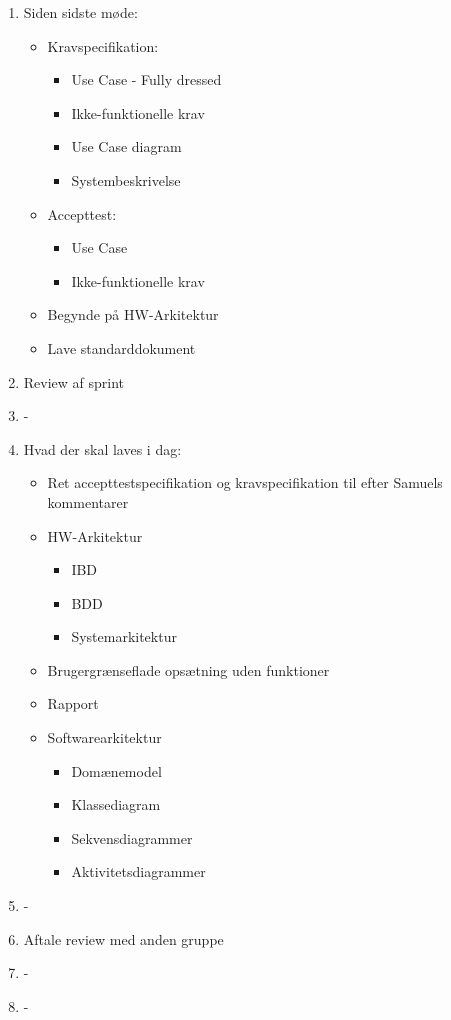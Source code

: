 \begin{enumerate}
	\item Siden sidste møde:
	\begin{itemize}
	\item Kravspecifikation: 
		\begin{itemize}
			\item Use Case - Fully dressed
			\item Ikke-funktionelle krav
			\item Use Case diagram
			\item Systembeskrivelse
		\end{itemize}
	\item Accepttest:
		\begin{itemize}
			\item Use Case
			\item Ikke-funktionelle krav
		\end{itemize}
	\item Begynde på HW-Arkitektur
	\item Lave standarddokument	
	\end{itemize}
	
	\item Review af sprint
	\item -
	\item Hvad der skal laves i dag:
	\begin{itemize}
	\item Ret accepttestspecifikation og kravspecifikation til efter Samuels kommentarer
	\item HW-Arkitektur
		\begin{itemize}
			\item IBD
			\item BDD
			\item Systemarkitektur
		\end{itemize}
	\item Brugergrænseflade opsætning uden funktioner
	\item Rapport
	\item Softwarearkitektur
		\begin{itemize}
			\item Domænemodel
			\item Klassediagram
			\item Sekvensdiagrammer
			\item Aktivitetsdiagrammer
		\end{itemize}
		
	\end{itemize}
	\item -
	\item Aftale review med anden gruppe
	\item -
	\item -
\end{enumerate}

\clearpage